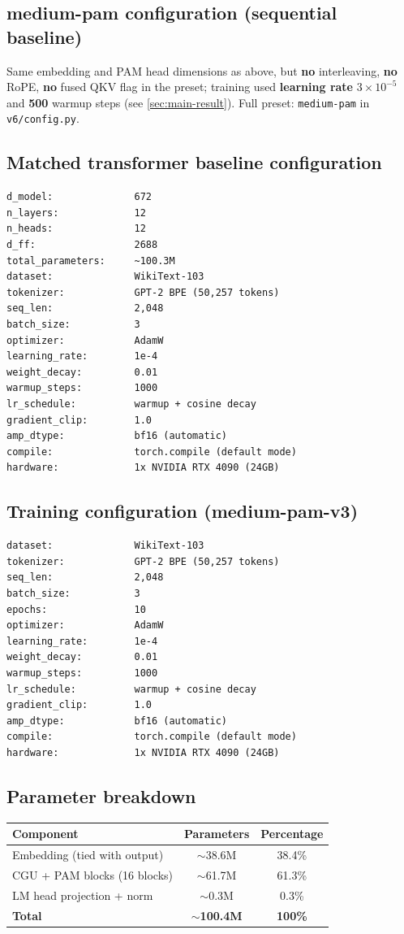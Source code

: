 \documentclass[11pt]{article}
\begin{document}
\subsection{medium-pam configuration (sequential baseline)}
Same embedding and PAM head dimensions as above, but \textbf{no} interleaving, \textbf{no} RoPE, \textbf{no} fused QKV flag in the preset; training used \textbf{learning rate} $3 \times 10^{-5}$ and \textbf{500} warmup steps (see \cref{sec:main-result}). Full preset: \texttt{medium-pam} in \texttt{v6/config.py}.

\subsection{Matched transformer baseline configuration}
\begin{verbatim}
d_model:              672
n_layers:             12
n_heads:              12
d_ff:                 2688
total_parameters:     ~100.3M
dataset:              WikiText-103
tokenizer:            GPT-2 BPE (50,257 tokens)
seq_len:              2,048
batch_size:           3
optimizer:            AdamW
learning_rate:        1e-4
weight_decay:         0.01
warmup_steps:         1000
lr_schedule:          warmup + cosine decay
gradient_clip:        1.0
amp_dtype:            bf16 (automatic)
compile:              torch.compile (default mode)
hardware:             1x NVIDIA RTX 4090 (24GB)
\end{verbatim}

\subsection{Training configuration (medium-pam-v3)}
\begin{verbatim}
dataset:              WikiText-103
tokenizer:            GPT-2 BPE (50,257 tokens)
seq_len:              2,048
batch_size:           3
epochs:               10
optimizer:            AdamW
learning_rate:        1e-4
weight_decay:         0.01
warmup_steps:         1000
lr_schedule:          warmup + cosine decay
gradient_clip:        1.0
amp_dtype:            bf16 (automatic)
compile:              torch.compile (default mode)
hardware:             1x NVIDIA RTX 4090 (24GB)
\end{verbatim}

\subsection{Parameter breakdown}
\begin{table}[h]
  \centering
  \begin{tabular}{@{}lcc@{}}
    \toprule
    Component & Parameters & Percentage \\
    \midrule
    Embedding (tied with output) & $\sim$38.6M & 38.4\% \\
    CGU + PAM blocks (16 blocks) & $\sim$61.7M & 61.3\% \\
    LM head projection + norm & $\sim$0.3M & 0.3\% \\
    \textbf{Total} & \textbf{$\sim$100.4M} & \textbf{100\%} \\
    \bottomrule
  \end{tabular}
\end{table}
\end{document}
